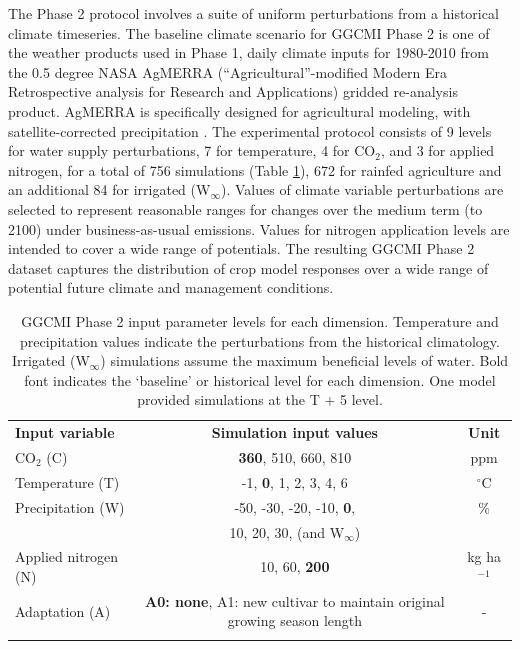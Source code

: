 \documentclass[gmd, manuscript]{copernicus} %
\begin{document}
The Phase 2 protocol involves a suite of uniform perturbations from a historical climate timeseries.
The baseline climate scenario for GGCMI Phase 2 is one of the weather products used in Phase 1, daily climate inputs for 1980-2010 from the 0.5 degree NASA AgMERRA (``Agricultural''-modified Modern Era Retrospective analysis for Research and Applications) gridded re-analysis product. AgMERRA is specifically designed for agricultural modeling, with satellite-corrected precipitation \citep{Ruane2015}. 
The experimental protocol consists of 9 levels for water supply perturbations, 7 for temperature, 4 for CO$_2$, and 3 for applied nitrogen, for a total of 756 simulations (Table \ref{table:inputs}), 672 for rainfed agriculture and an additional 84 for irrigated (W$_{\infty}$).  
Values of climate variable perturbations are selected to represent reasonable ranges for changes over the medium term (to 2100) under business-as-usual emissions. 
Values for nitrogen application levels are intended to cover a wide range of potentials. The resulting GGCMI Phase 2 dataset captures the distribution of crop model responses over a wide range of potential future climate and management conditions.
 

\begin{table}[t]
  \caption{
  GGCMI Phase 2 input parameter levels for each dimension. Temperature and precipitation values indicate the perturbations from the historical climatology. 
Irrigated (W$_{\infty}$) simulations assume the maximum beneficial levels of water. 
Bold font indicates the `baseline' or historical level for each dimension. One model provided simulations at the T + 5 level.
  }
  \label{table:inputs} 
  \begin{tabular}{lcc} 
      \tophline \vspace{1mm}
      \textbf{Input variable} & \textbf{Simulation input values} & \textbf{Unit} \\ \middlehline \vspace{1mm}
      CO$_2$ (C) & \textbf{360}, 510, 660, 810 & ppm\\ \middlehline \vspace{1mm}
      Temperature (T) & -1, \textbf{0}, 1, 2, 3, 4, 6 & $^{\circ}$C\\ \middlehline \vspace{1mm}
      Precipitation (W) & -50, -30, -20, -10, \textbf{0}, & \% \\
      {} & 10, 20, 30, (and W$_{\infty}$) & {} \\ \middlehline \vspace{1mm}
      Applied nitrogen (N) & 10, 60, \textbf{200} & kg ha$^{-1}$ \\ \middlehline \vspace{1mm}
      Adaptation (A) & \textbf{A0: none}, A1: new cultivar to maintain original growing season length & -\\ \bottomhline
  \end{tabular}\\
\end{table}
\end{document}

